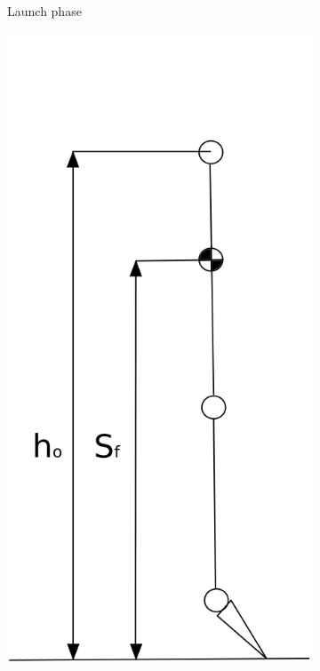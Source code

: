 \begin{figure}[ht!]
\begin{subfigure}[b]{0.3\textwidth}
        \caption{Launch phase}
        \label{fig:launch_phase}
    \end{subfigure}
    \begin{subfigure}[b]{0.3\textwidth}
        \includegraphics[width=\textwidth]{figures/takeoff_phase.png}

\end{subfigure}
\end{figure}
